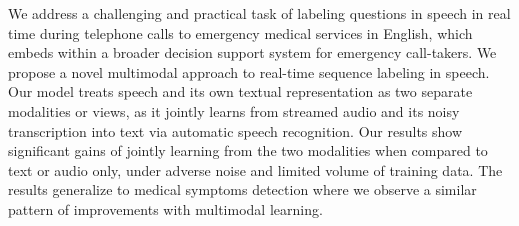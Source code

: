 We address a challenging and practical task of labeling questions in speech in real time during telephone calls to emergency medical services in English, which embeds within a broader decision support system for emergency call-takers. We propose a novel multimodal approach to real-time sequence labeling in speech. Our model treats speech and its own textual representation as two separate modalities or views, as it jointly learns from streamed audio and its noisy transcription into text via automatic speech recognition. Our results show significant gains of jointly learning from the two modalities when compared to text or audio only, under adverse noise and limited volume of training data. The results generalize to medical symptoms detection where we observe a similar pattern of improvements with multimodal learning.
